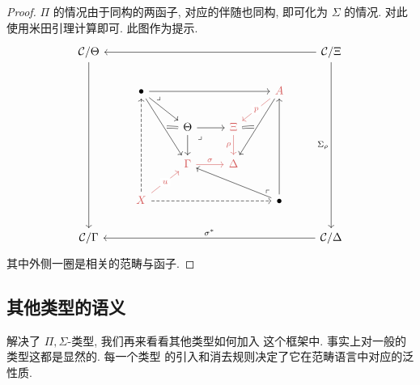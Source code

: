 \begin{proof}
\(\Pi\) 的情况由于同构的两函子, 对应的伴随也同构, 即可化为 \(\Sigma\) 的情况.
对此使用米田引理计算即可. 此图作为提示.
  \[\begin{tikzcd}
    {\mathcal C/\Theta} &&&&& {\mathcal C/\Xi} \\
    & \bullet &&& \textcolor{rgb,255:red,214;green,92;blue,92}{A} \\
    && \Theta & \textcolor{rgb,255:red,214;green,92;blue,92}{\Xi} \\
    && \textcolor{rgb,255:red,214;green,92;blue,92}{\Gamma} & \textcolor{rgb,255:red,214;green,92;blue,92}{\Delta} \\
    & \textcolor{rgb,255:red,214;green,92;blue,92}{X} &&& \bullet \\
    {\mathcal C/\Gamma} &&&&& {\mathcal C/\Delta}
    \arrow["\sigma", color={rgb,255:red,214;green,92;blue,92}, from=4-3, to=4-4]
    \arrow[from=3-3, to=4-3]
    \arrow["\rho"', color={rgb,255:red,214;green,92;blue,92}, from=3-4, to=4-4]
    \arrow[from=3-3, to=3-4]
    \arrow["\lrcorner"{anchor=center, pos=0.125}, draw=none, from=3-3, to=4-4]
    \arrow["{\Sigma_\rho}"', from=1-6, to=6-6]
    \arrow["{\sigma^*}"', from=6-6, to=6-1]
    \arrow[from=1-6, to=1-1]
    \arrow[from=1-1, to=6-1]
    \arrow["p"{description}, color={rgb,255:red,214;green,92;blue,92}, from=2-5, to=3-4]
    \arrow[from=5-5, to=2-5]
    \arrow[from=5-5, to=4-3]
    \arrow["\lrcorner"{anchor=center, pos=0.125, rotate=180}, draw=none, from=5-5, to=4-4]
    \arrow[from=2-2, to=2-5]
    \arrow[from=2-2, to=3-3]
    \arrow["\lrcorner"{anchor=center, pos=0.125}, draw=none, from=2-2, to=3-4]
    \arrow[dashed, from=5-2, to=2-2]
    \arrow[dashed, from=5-2, to=5-5]
    \arrow["u"{description}, color={rgb,255:red,214;green,92;blue,92}, from=5-2, to=4-3]
    \arrow[""{name=0, anchor=center, inner sep=0}, from=2-5, to=4-4]
    \arrow[""{name=1, anchor=center, inner sep=0}, from=2-2, to=4-3]
    \arrow[shorten >=2pt, Rightarrow, no head, from=3-4, to=0]
    \arrow[shorten <=2pt, Rightarrow, no head, from=1, to=3-3]
  \end{tikzcd}\]
  其中外侧一圈是相关的范畴与函子.
\end{proof}

\subsection{其他类型的语义}\label{category:lccc:other}

解决了 \(\Pi,\Sigma\)-类型, 我们再来看看其他类型如何加入
这个框架中. 事实上对一般的类型这都是显然的. 每一个类型
的引入和消去规则决定了它在范畴语言中对应的泛性质.

